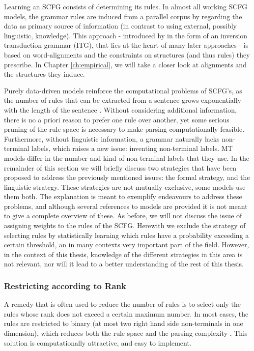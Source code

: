 Learning an SCFG consists of determining its rules. In almost all working SCFG models, the grammar rules are induced from a parallel corpus by regarding the data as primary source of information (in contrast to using external, possibly linguistic, knowledge). This approach - introduced by \cite{wu1995algorithm} in the form of an inversion transduction grammar (ITG), that lies at the heart of many later approaches - is based on word-alignments and the constraints on structures (and thus rules) they prescribe. In Chapter \ref{ch:empirical}, we will take a closer look at alignments and the structures they induce. 

Purely data-driven models reinforce the computational problems of SCFG's, as the number of rules that can be extracted from a sentence grows exponentially with the length of the sentence \citep{quirk2006dependency}. Without considering additional information, there is no a priori reason to prefer one rule over another, yet some serious pruning of the rule space is necessary to make parsing computationally feasible. Furthermore, without linguistic information, a grammar naturally lacks non-terminal labels, which raises a new issue: inventing non-terminal labels. MT models differ in the number and kind of non-terminal labels that they use. In the remainder of this section we will briefly discuss two strategies that have been proposed to address the previously mentioned issues: the formal strategy, and the linguistic strategy. These strategies are not mutually exclusive, some models use them both. The explanation is meant to exemplify endeavours to address these problems, and although several references to models are provided it is not meant to give a complete overview of these. As before, we will not discuss the issue of assigning weights to the rules of the SCFG. Herewith we exclude the strategy of selecting rules by statistically learning which rules have a probability exceeding a certain threshold, an in many contexts very important part of the field. However, in the context of this thesis, knowledge of the different strategies in this area is not relevant, nor will it lead to a better understanding of the rest of this thesis.

\subsubsection{Restricting according to Rank}

A remedy that is often used to reduce the number of rules is to select only the rules whose rank does not exceed a certain maximum number. In most cases, the rules are restricted to binary (at most two right hand side non-terminals in one dimension), which reduces both the rule space and the parsing complexity \citep[e.g,][]{wu1997stochastic,chiang2005hierarchical,mylonakis2011learning}. This solution is computationally attractive, and easy to implement. 

